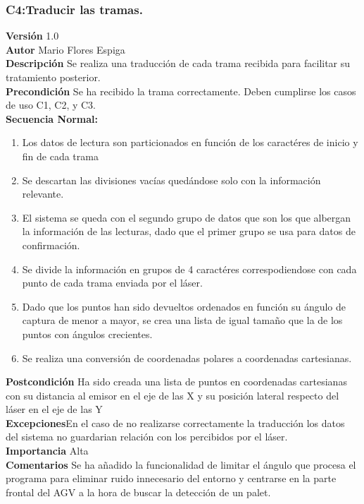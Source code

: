  \subsubsection{ C4:Traducir las tramas.}
\textbf{Versión} 1.0\\
\textbf{Autor} Mario Flores Espiga\\
\textbf{Descripción} Se realiza una traducción de cada trama recibida para facilitar su tratamiento posterior.\\
\textbf{Precondición} Se ha recibido la trama correctamente. Deben cumplirse los casos de uso C1, C2, y C3.\\
\textbf{Secuencia Normal:} 
\begin{enumerate}
	\item Los datos de lectura son particionados en función de los caractéres de inicio y fin de cada trama
	\item Se descartan las divisiones vacías quedándose solo con la información relevante.
	\item El sistema se queda con el segundo grupo de datos que son los que albergan la información de las lecturas, dado que el primer grupo se usa para datos de confirmación.
	\item Se divide la información en grupos de 4 caractéres correspodiendose con cada punto de cada trama enviada por el láser.
	\item Dado que los puntos han sido devueltos ordenados en función su ángulo de captura de menor a mayor, se crea una lista de igual tamaño que la de los puntos con ángulos crecientes.
	\item Se realiza una conversión de coordenadas polares a coordenadas cartesianas.

\end{enumerate}
\textbf{Postcondición} Ha sido creada una lista de puntos en coordenadas cartesianas con su distancia al emisor en el eje de las X y su posición lateral respecto del láser en el eje de las Y\\
\textbf{Excepciones}En el caso de no realizarse correctamente la traducción los datos del sistema no guardarian relación con los percibidos por el láser.\\
\textbf{Importancia} Alta\\
\textbf{Comentarios} Se ha añadido la funcionalidad de limitar el ángulo que procesa el programa para eliminar ruido innecesario del entorno y centrarse en la parte frontal del AGV a la hora de buscar la detección de un palet.


